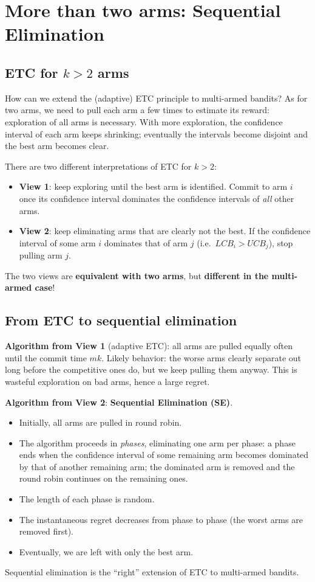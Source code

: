 \section{More than two arms: Sequential Elimination}

\subsection{ETC for $k > 2$ arms}

How can we extend the (adaptive) ETC principle to multi-armed bandits? As for two arms, we need to pull each arm a few times to estimate its reward: exploration of all arms is necessary. With more exploration, the confidence interval of each arm keeps shrinking; eventually the intervals become disjoint and the best arm becomes clear.

There are two different interpretations of ETC for $k > 2$:
\begin{itemize}
    \item \textbf{View 1}: keep exploring until the best arm is identified. Commit to arm $i$ once its confidence interval dominates the confidence intervals of \emph{all} other arms.
    \item \textbf{View 2}: keep eliminating arms that are clearly not the best. If the confidence interval of some arm $i$ dominates that of arm $j$ (i.e.\ $LCB_i > UCB_j$), stop pulling arm $j$.
\end{itemize}
The two views are \textbf{equivalent with two arms}, but \textbf{different in the multi-armed case}!

\subsection{From ETC to sequential elimination}

\textbf{Algorithm from View 1} (adaptive ETC): all arms are pulled equally often until the commit time $mk$. Likely behavior: the worse arms clearly separate out long before the competitive ones do, but we keep pulling them anyway. This is wasteful exploration on bad arms, hence a large regret.

\textbf{Algorithm from View 2}: \textbf{Sequential Elimination (SE)}.
\begin{itemize}
    \item Initially, all arms are pulled in round robin.
    \item The algorithm proceeds in \emph{phases}, eliminating one arm per phase: a phase ends when the confidence interval of some remaining arm becomes dominated by that of another remaining arm; the dominated arm is removed and the round robin continues on the remaining ones.
    \item The length of each phase is random.
    \item The instantaneous regret decreases from phase to phase (the worst arms are removed first).
    \item Eventually, we are left with only the best arm.
\end{itemize}
Sequential elimination is the ``right'' extension of ETC to multi-armed bandits.

